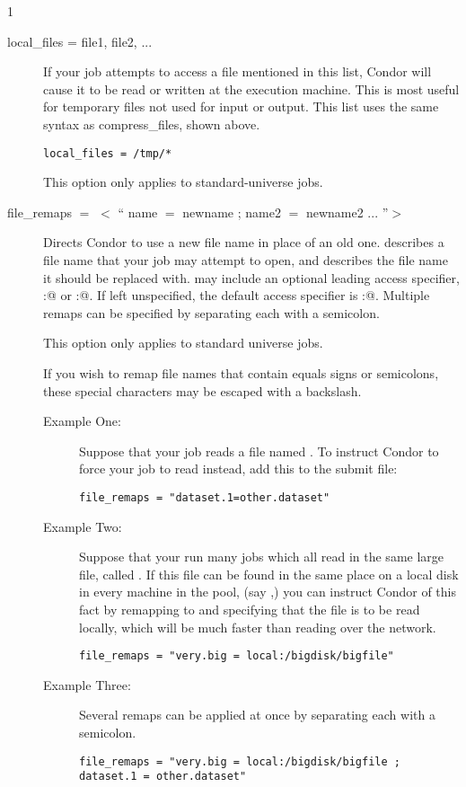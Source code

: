 \begin{ManPage}{\label{man-condor-submit}}{1}
\begin{description}
\item[local\_files = file1, file2, ...]

If your job attempts to access a file mentioned in this list,
Condor will cause it to be read or written at the execution machine.
This is most useful for temporary files not used for input or output.
This list uses the same syntax as compress\_files, shown above.

\begin{verbatim}
local_files = /tmp/*
\end{verbatim}

This option only applies to standard-universe jobs.


\item[file\_remaps $=$ $<$ `` name $=$ newname ; name2 $=$ newname2 ... ''$>$ ]

Directs Condor to use a new file name in place of an old one.  
describes a file name that your job may attempt to open, and 
describes the file name it should be replaced with.
 may include an optional leading
access specifier, \verb@local:@ or \verb@remote:@.  If left unspecified,
the default access specifier is \verb@remote:@.  Multiple remaps can be 
specified by separating each with a semicolon.

This option only applies to standard universe jobs.

If you wish to remap file names that contain equals signs or semicolons,
these special characters may be escaped with a backslash.

\begin{description}
\item[Example One:]
Suppose that your job reads a file named .
To instruct Condor
to force your job to read  instead, 
add this to the submit file:
\begin{verbatim}
file_remaps = "dataset.1=other.dataset"
\end{verbatim}
\item[Example Two:]
Suppose that your run many jobs which all read in the same large file,
called .
If this file can be found in the same place on
a local disk in every machine in the pool,
(say ,) you can
instruct Condor of this fact by remapping  to
 and specifying that the file is to be read locally,
which will be much faster than reading over the network.
\begin{verbatim}
file_remaps = "very.big = local:/bigdisk/bigfile"
\end{verbatim}
\item[Example Three:]
Several remaps can be applied at once by separating each with a semicolon.
\begin{verbatim}
file_remaps = "very.big = local:/bigdisk/bigfile ; dataset.1 = other.dataset"
\end{verbatim}
\end{description}


\end{description}
\end{ManPage}
